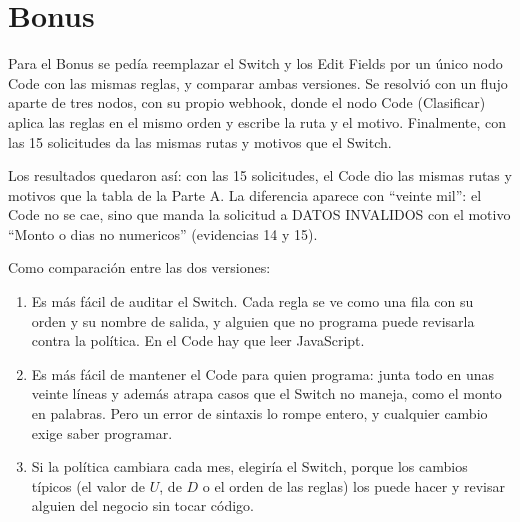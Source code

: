 \documentclass{article}
\begin{document}
\section*{Bonus}
Para el Bonus se pedía reemplazar el Switch y los Edit Fields por un único nodo Code con las
mismas reglas, y comparar ambas versiones. Se resolvió con un flujo aparte de tres nodos, con su
propio webhook, donde el nodo Code (\textsf{Clasificar}) aplica las reglas en el mismo orden y
escribe la ruta y el motivo. Finalmente, con las 15 solicitudes da las mismas rutas y motivos que
el Switch.

\begin{center}
\end{center}

Los resultados quedaron así: con las 15 solicitudes, el Code dio las mismas rutas y motivos que la
tabla de la Parte A. La diferencia aparece con ``veinte mil'': el Code no se cae, sino que manda
la solicitud a DATOS INVALIDOS con el motivo ``Monto o dias no numericos'' (evidencias 14 y 15).

Como comparación entre las dos versiones:
\begin{enumerate}
\item Es más fácil de auditar el Switch. Cada regla se ve como una fila con su orden y su nombre
de salida, y alguien que no programa puede revisarla contra la política. En el Code hay que leer
JavaScript.
\item Es más fácil de mantener el Code para quien programa: junta todo en unas veinte líneas y
además atrapa casos que el Switch no maneja, como el monto en palabras. Pero un error de
sintaxis lo rompe entero, y cualquier cambio exige saber programar.
\item Si la política cambiara cada mes, elegiría el Switch, porque los cambios típicos (el valor
de $U$, de $D$ o el orden de las reglas) los puede hacer y revisar alguien del negocio sin tocar
código.
\end{enumerate}
\end{document}
